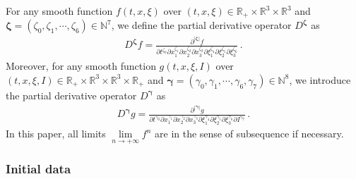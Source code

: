 \documentclass[reqno,11pt]{amsart}
\numberwithin{equation}{section}
\def\R{\mathbb{R}}
\begin{document}
For any smooth function $f (t,x,\xi)$ over $ (t,x,\xi) \in \R_+ \times \R^3 \times \R^3 $ and $\boldsymbol{\zeta} = ( \zeta_0, \zeta_1, \cdots, \zeta_6 ) \in \mathbb{N}^7$, we define the partial derivative operator $D^{ \boldsymbol{ \zeta } }$ as
\begin{equation*}
  \begin{aligned}
    D^{ \boldsymbol{ \zeta } } f = \frac{ \partial^{ | \boldsymbol{\zeta} | } f }{  \partial t^{\zeta_0} \partial x_1^{\zeta_1} \partial x_2^{\zeta_2} \partial x_3^{\zeta_3} \partial \xi_1^{\zeta_4} \partial \xi_2^{\zeta_5} \partial \xi_3^{\zeta_6} } \,.
  \end{aligned}
\end{equation*}
Moreover, for any smooth function $g (t,x,\xi, I)$ over $ (t,x,\xi, I) \in \R_+ \times \R^3 \times \R^3 \times \R_+$ and $\boldsymbol{\gamma} = ( \gamma_0, \gamma_1, \cdots, \gamma_6, \gamma_7 ) \in \mathbb{N}^8$, we introduce the partial derivative operator $D^{ \boldsymbol{ \gamma } }$ as
\begin{equation*}
  \begin{aligned}
    D^{ \boldsymbol{ \gamma } } g = \frac{ \partial^{ | \boldsymbol{\gamma} | } g }{  \partial t^{\gamma_0} \partial x_1^{\gamma_1} \partial x_2^{\gamma_2} \partial x_3^{\gamma_3} \partial \xi_1^{\gamma_4} \partial \xi_2^{\gamma_5} \partial \xi_3^{\gamma_6} \partial I^{\gamma_7} } \,.
  \end{aligned}
\end{equation*}
In this paper, all limits $\lim\limits_{n \to + \infty} f^n$ are in the sense of subsequence if necessary.



 
\subsubsection{Initial data}
\end{document}
